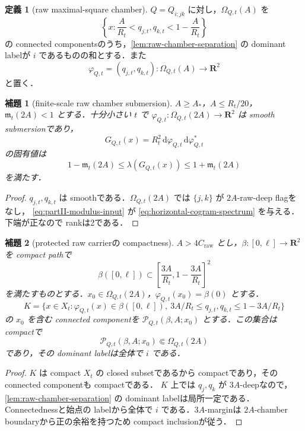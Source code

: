 \documentclass[a4paper,11pt]{ltjsarticle}
\numberwithin{equation}{section}
\theoremstyle{plain}
\newtheorem{lemma}[lemma]{補題}
\theoremstyle{definition}
\newtheorem{definition}[definition]{定義}
\theoremstyle{remark}
\newcommand{\RR}{\mathbf R}
\newcommand{\cP}{\mathcal P}
\newcommand{\dd}{\,\mathrm d}
\begin{document}
\begin{definition}[raw maximal-square chamber]\label{def:raw-square-chamber}
$Q=Q_{i;jk}$ に対し，$\Omega_{Q,t}(A)$ を
\[
 \left\{x:\frac A{R_t}<q_{j,t},q_{k,t}<1-\frac A{R_t}\right\}
\]
の connected componentsのうち，\cref{lem:raw-chamber-separation} の dominant labelが $i$ であるものの和とする．また
\[
 \varphi_{Q,t}=(q_{j,t},q_{k,t}):\Omega_{Q,t}(A)\longrightarrow\RR^2
\]
と置く．
\end{definition}

\begin{lemma}[finite-scale raw chamber submersion]\label{lem:deep-square-submersion}
$A\ge A_*$，$A\le R_t/20$，$\mathfrak m_t(2A)<1$ とする．十分小さい $t$ で
$\varphi_{Q,t}:\Omega_{Q,t}(2A)\to\RR^2$ は smooth submersionであり，
\begin{equation}\label{eq:horizontal-cogram}
 G_{Q,t}(x)=R_t^2\dd\varphi_{Q,t}\dd\varphi_{Q,t}^{*}
\end{equation}
の固有値は
\begin{equation}\label{eq:horizontal-cogram-spectrum}
 1-\mathfrak m_t(2A)\le\lambda(G_{Q,t}(x))\le1+\mathfrak m_t(2A)
\end{equation}
を満たす．
\end{lemma}

\begin{proof}
$q_{j,t},q_{k,t}$ は smoothである．$\Omega_{Q,t}(2A)$ では $\{j,k\}$ が $2A$-raw-deep flagをなし，
\cref{eq:partII-modulus-input} が \eqref{eq:horizontal-cogram-spectrum} を与える．下端が正なので rankは2である．
\end{proof}

\begin{lemma}[protected raw carrierの compactness]\label{lem:protected-raw-carrier}
$A>4C_{\mathrm{raw}}$ とし，$\beta:[0,\ell]\to\RR^2$ を compact pathで
\[
 \beta([0,\ell])\subset
 \left[\frac{3A}{R_t},1-\frac{3A}{R_t}\right]^2
\]
を満たすものとする．$x_0\in\Omega_{Q,t}(2A)$，$\varphi_{Q,t}(x_0)=\beta(0)$ とする．
\[
 K=\{x\in X_t:\varphi_{Q,t}(x)\in\beta([0,\ell]),\ 
       3A/R_t\le q_{j,t},q_{k,t}\le1-3A/R_t\}
\]
の $x_0$ を含む connected componentを $\cP_{Q,t}(\beta,A;x_0)$ とする．この集合は compactで
\[
 \cP_{Q,t}(\beta,A;x_0)\Subset\Omega_{Q,t}(2A)
\]
であり，その dominant labelは全体で $i$ である．
\end{lemma}

\begin{proof}
$K$ は compact $X_t$ の closed subsetであるから compactであり，その connected componentも compactである．
$K$ 上では $q_j,q_k$ が $3A$-deepなので，\cref{lem:raw-chamber-separation} の dominant labelは局所一定である．
Connectednessと始点の labelから全体で $i$ である．$3A$-marginは $2A$-chamber boundaryから正の余裕を持つため compact inclusionが従う．
\end{proof}
\end{document}
